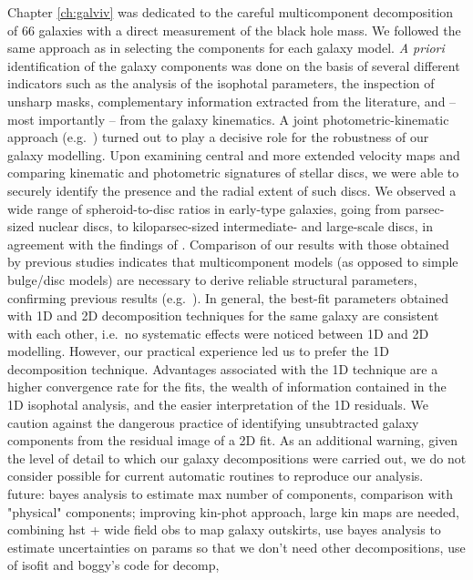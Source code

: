 Chapter \ref{ch:galviv} was dedicated to the careful multicomponent decomposition of 66 galaxies 
with a direct measurement of the black hole mass. 
We followed the same approach as \citet{laurikainen2005} in selecting the components for each galaxy model.  
\emph{A priori} identification of the galaxy components was done on the basis of several different indicators 
such as the analysis of the isophotal parameters, 
the inspection of unsharp masks, 
complementary information extracted from the literature, 
and -- most importantly -- from the galaxy kinematics. 
A joint photometric-kinematic approach (e.g.~\citealt{krajnovic2013,arnold2014}) 
turned out to play a decisive role for the robustness of our galaxy modelling. 
Upon examining central \citep{atlas3dIII,scott2014} and more extended \citep{arnold2014} velocity maps 
and comparing kinematic and photometric signatures of stellar discs, 
we were able to securely identify the presence and the radial extent of such discs. 
We observed a wide range of spheroid-to-disc ratios in early-type galaxies, 
going from parsec-sized nuclear discs, to kiloparsec-sized intermediate- and large-scale discs, 
in agreement with the findings of \citet{krajnovic2013}. 
Comparison of our results with those obtained by previous studies indicates that 
multicomponent models (as opposed to simple bulge/disc models) are necessary 
to derive reliable structural parameters, confirming previous results 
(e.g.~\citealt{laurikainen2005,laurikainen2007,laurikainen2010,lasker2014data,salo2015}). 
In general, the best-fit parameters obtained with 1D and 2D decomposition techniques for the same galaxy 
are consistent with each other, 
i.e.~no systematic effects were noticed between 1D and 2D modelling. 
However, our practical experience led us to prefer the 1D decomposition technique. 
Advantages associated with the 1D technique are a higher convergence rate for the fits, 
the wealth of information contained in the 1D isophotal analysis, 
and the easier interpretation of the 1D residuals. 
We caution against the dangerous practice of identifying unsubtracted galaxy components 
from the residual image of a 2D fit. 
As an additional warning, 
given the level of detail to which our galaxy decompositions were carried out, 
we do not consider possible for current automatic routines to reproduce our analysis. \\
future: bayes analysis to estimate max number of components, comparison with "physical" components; 
improving kin-phot approach, large kin maps are needed, 
combining hst + wide field obs to map galaxy outskirts, 
use bayes analysis to estimate uncertainties on params so that we don't need other decompositions, 
use of isofit and boggy's code for decomp, \\


